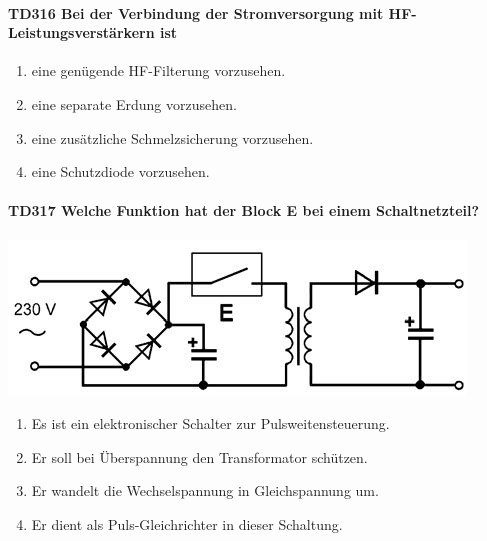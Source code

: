\documentclass[8pt]{article}
\begin{document}
\begin{enumerate}
\begin{enumerate}[nolistsep,label=\Alph*]
\paragraph*{TD316 Bei der Verbindung der Stromversorgung mit HF-Leistungsverstärkern ist} 
\begin{enumerate}[nolistsep,label=\Alph*]
\item eine genügende HF-Filterung vorzusehen.
\item eine separate Erdung vorzusehen.
\item eine zusätzliche Schmelzsicherung vorzusehen.
\item eine Schutzdiode vorzusehen.
\end{enumerate}

\paragraph*{TD317 Welche Funktion hat der Block E bei einem Schaltnetzteil?}
\begin{center}
	\begin{minipage}{\linewidth}
		\centering
		\includegraphics[scale=1.0]{pics/td317_a.jpg}
	\end{minipage}
\end{center}
\begin{enumerate}[nolistsep,label=\Alph*]
\item Es ist ein elektronischer Schalter zur Pulsweitensteuerung.
\item Er soll bei Überspannung den Transformator schützen.
\item Er wandelt die Wechselspannung in Gleichspannung um.
\item Er dient als Puls-Gleichrichter in dieser Schaltung.
\end{enumerate}


\end{enumerate}
\end{enumerate}
\end{document}
